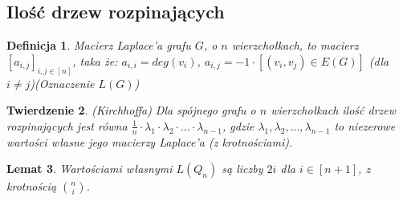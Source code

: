 \documentclass{pracamgr}
\newtheorem{theorem}{Twierdzenie}[chapter]
\newtheorem{defi}[theorem]{Definicja}
\newtheorem{lemma}[theorem]{Lemat}
\begin{document}
   \subsection{Ilość drzew rozpinających}
    \vspace{5pt}
    \begin{defi}
     Macierz Laplace'a grafu $G$, o $n$ wierzchołkach, to macierz $[a_{i,j}]_{i,j\in[n]}$, taka że:\quad
     $a_{i,i}=deg(v_i)$, $a_{i,j}=-1\cdot [(v_i,v_j)\in E(G)]$ (dla $i\neq j$)\quad(Oznaczenie $L(G)$)
    \end{defi}
    \vspace{5pt}
    \begin{theorem}\label{Kirchhoff}
     (Kirchhoffa)\newline
     Dla spójnego grafu o $n$ wierzchołkach ilość drzew rozpinających jest równa $\frac{1}{n}\cdot\lambda_1\cdot\lambda_2\cdot...\cdot\lambda_{n-1}$,
     gdzie $\lambda_1,\lambda_2,...,\lambda_{n-1}$ to niezerowe wartości własne jego macierzy Laplace'a (z krotnościami).
    \end{theorem}
    \vspace{5pt}
    \begin{lemma}
     Wartościami własnymi $L(Q_n)$ są liczby $2i$ dla $i\in[n+1]$, z krotnością ${n\choose i}$.
    \end{lemma}
\end{document}
